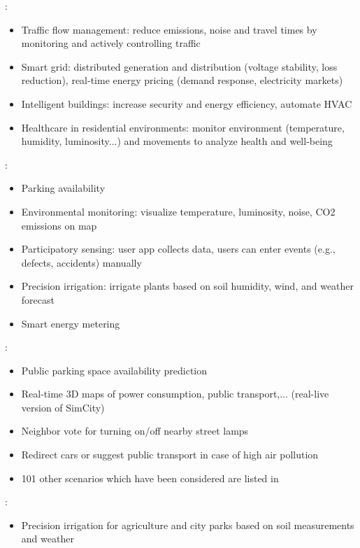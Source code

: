 \documentclass[parskip=half]{scrartcl}
\begin{document}
\cite[p.~209~ff.]{Angelakis.2017}:
\begin{itemize}
	\item Traffic flow management: reduce emissions, noise and travel times by monitoring and actively controlling traffic
	\item Smart grid: distributed generation and distribution (voltage stability, loss reduction), real-time energy pricing (demand response, electricity markets)
	\item Intelligent buildings: increase security and energy efficiency, automate HVAC
	\item Healthcare in residential environments:  monitor environment (temperature, humidity, luminosity...) and movements to analyze health and well-being
\end{itemize}

\cite[p.~16]{Fernandes.2012}:
\begin{itemize}
	\item Parking availability
	\item Environmental monitoring: visualize temperature, luminosity, noise, CO2 emissions on map
	\item Participatory sensing: user app collects data, users can enter events (e.g., defects, accidents) manually
	\item Precision irrigation: irrigate plants based on soil humidity, wind, and weather forecast
	\item Smart energy metering
\end{itemize}

\cite[p.~30]{Presser.2014}:
\begin{itemize}
	\item Public parking space availability prediction
	\item Real-time 3D maps of power consumption, public transport,... (real-live version of SimCity)
	\item Neighbor vote for turning on/off nearby street lamps
	\item Redirect cars or suggest public transport in case of high air pollution
	\item 101 other scenarios which have been considered are listed in \cite{CityPulseConsortium.2020}
\end{itemize}

\cite[p.~1]{Garcia.2020}:
\begin{itemize}
	\item Precision irrigation for agriculture and city parks based on soil measurements and weather
\end{itemize}
\end{document}
